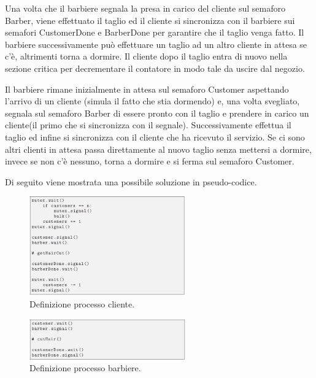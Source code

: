 Una volta che il barbiere segnala la presa in carico del cliente sul semaforo \textsf{Barber}, viene effettuato il taglio ed il cliente si sincronizza con il barbiere sui semafori \textsf{CustomerDone} e \textsf{BarberDone} per garantire che il taglio venga fatto. Il barbiere successivamente può effettuare un taglio ad un altro cliente in attesa se c'è, altrimenti torna a dormire. Il cliente dopo il taglio entra di nuovo nella sezione critica per decrementare il contatore in modo tale da uscire dal negozio.

Il barbiere rimane inizialmente in attesa sul semaforo \textsf{Customer} aspettando l'arrivo di un cliente (simula il fatto che stia dormendo) e, una volta svegliato, segnala sul semaforo \textsf{Barber} di essere pronto con il taglio e prendere in carico un cliente(il primo che si sincronizza con il segnale). Successivamente effettua il taglio ed infine si sincronizza con il cliente che ha ricevuto il servizio. Se ci sono altri clienti in attesa passa direttamente al nuovo taglio senza mettersi a dormire, invece se non c'è nessuno, torna a dormire e si ferma sul semaforo \textsf{Customer}.

\pagebreak
Di seguito viene mostrata una possibile soluzione in pseudo-codice.


\begin{figure}[h]
	\centering
	\includegraphics[width=0.6\textwidth]{Figure/2.png}
	\caption{Definizione processo cliente.}
\end{figure}

\begin{figure}[h]
	\centering
	\includegraphics[width=0.6\textwidth]{Figure/3.png}
	\caption{Definizione processo barbiere.}
\end{figure}
